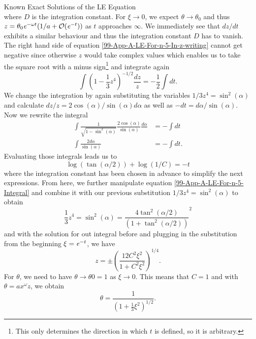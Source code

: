 \begin{appendix}
\begin{section}
\begin{subsection}{Known Exact Solutions of the LE Equation}
\begin{equation}
\end{equation}
where $D$ is the integration constant. For $\xi\rightarrow0$, we expect $\theta\rightarrow\theta_0$ and thus $z=\theta_0\mathit{e}^{-\omega t}(1/a+\mathcal{O}(\mathit{e}^{-t}))$ as $t$ approaches $\infty$. We immediately see that $dz/dt$ exhibits a similar behaviour and thus the integration constant $D$ has to vanish.\\
The right hand side of equation \ref{99-App-A-LE-For-n-5-In-z-writing} cannot get negative since otherwise $z$ would take complex values which enables us to take the square root with a minus sign\footnote{This only determines the direction in which $t$ is defined, so it is arbitrary.} and integrate again
\begin{equation}
	\int\left(1-\frac{1}{3}z^4\right)^{-1/2}\frac{dz}{z}=-\frac{1}{2}\int dt.
\end{equation}
We change the integration by again substituting the variables $1/3z^4=\sin^2(\alpha)$ and calculate $dz/z=2\cos(\alpha)/\sin(\alpha)d\alpha$ as well as $-dt=d\alpha/\sin(\alpha)$. Now we rewrite the integral
\begin{align}
	\int\frac{1}{\sqrt{1-\sin^2(\alpha)}}\frac{2\cos(\alpha)}{\sin(\alpha)}\frac{d\alpha}{} &= -\int dt\\
	\int\frac{2d\alpha}{\sin(\alpha)} &= -\int dt.
\end{align}
Evaluating those integrals leads us to
\begin{equation}
	\log(\tan(\alpha/2))+\log(1/C) = -t
	\label{99-App-A-LE-For-n-5-Integral}
\end{equation}
where the integration constant has been chosen in advance to simplify the next expressions. From here, we further manipulate equation \ref{99-App-A-LE-For-n-5-Integral} and combine it with our previous substitution $1/3z^4=\sin^2(\alpha)$ to obtain
\begin{equation}
	\frac{1}{3}z^4=\sin^2(\alpha)=\frac{4\tan^2(\alpha/2)}{\left(1+\tan^2(\alpha/2)\right)}^2
\end{equation}
and with the solution for out integral before and plugging in the substitution from the beginning $\xi=\mathit{e}^{-t}$, we have
\begin{equation}
	z=\pm\left(\frac{12C^2\xi^2}{1+C^2\xi^2}\right)^{1/4}.
\end{equation}
For $\theta$, we need to have $\theta\rightarrow\theta0=1$ as $\xi\rightarrow0$. This means that $C=1$ and with $\theta=ax^\omega z$, we obtain
\begin{equation}
	\theta = \frac{1}{\left(1+\frac{1}{3}\xi^2\right)^{1/2}}.

\end{equation}
\end{subsection}
\end{section}
\end{appendix}

